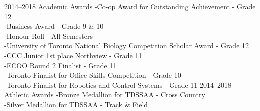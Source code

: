 \documentclass[]{chandan-cv}
\begin{document}
\begin{entrylist}
  \entry
    {2014–2018}
    {Academic Awards}
    {}
    {-Co-op Award for Outstanding Achievement - Grade 12
    \\-Business Award - Grade 9 \& 10
    \\-Honour Roll - All Semesters
    \\-University of Toronto National Biology Competition Scholar Award - Grade 12
    \\-CCC Junior 1st place Northview - Grade 11
    \\-ECOO Round 2 Finalist - Grade 11
    \\-Toronto Finalist for Office Skills Competition - Grade 10
    \\-Toronto Finalist for Robotics and Control Systems - Grade 11}
  \entry
    {2014–2018}
    {Athletic Awards}
    {}
    { -Bronze Medallion for TDSSAA - Cross Country
    \\-Silver Medallion for TDSSAA - Track \& Field}
\end{entrylist}
\end{document}
